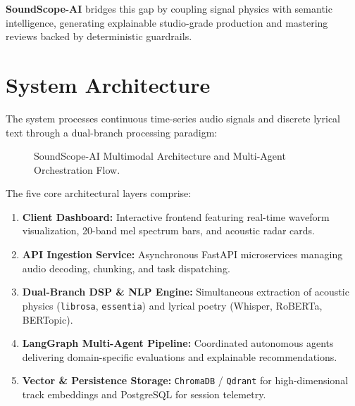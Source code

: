 \documentclass[11pt,a4paper]{article}
\begin{document}
\textbf{SoundScope-AI} bridges this gap by coupling signal physics with semantic intelligence, generating explainable studio-grade production and mastering reviews backed by deterministic guardrails.

\section{System Architecture}

The system processes continuous time-series audio signals and discrete lyrical text through a dual-branch processing paradigm:

\begin{figure}[htbp]
    \centering
    \caption{SoundScope-AI Multimodal Architecture and Multi-Agent Orchestration Flow.}
    \label{fig:architecture}
\end{figure}

The five core architectural layers comprise:
\begin{enumerate}
    \item \textbf{Client Dashboard:} Interactive frontend featuring real-time waveform visualization, 20-band mel spectrum bars, and acoustic radar cards.
    \item \textbf{API Ingestion Service:} Asynchronous FastAPI microservices managing audio decoding, chunking, and task dispatching.
    \item \textbf{Dual-Branch DSP \& NLP Engine:} Simultaneous extraction of acoustic physics (\texttt{librosa}, \texttt{essentia}) and lyrical poetry (Whisper, RoBERTa, BERTopic).
    \item \textbf{LangGraph Multi-Agent Pipeline:} Coordinated autonomous agents delivering domain-specific evaluations and explainable recommendations.
    \item \textbf{Vector \& Persistence Storage:} \texttt{ChromaDB} / \texttt{Qdrant} for high-dimensional track embeddings and PostgreSQL for session telemetry.
\end{enumerate}
\end{document}
